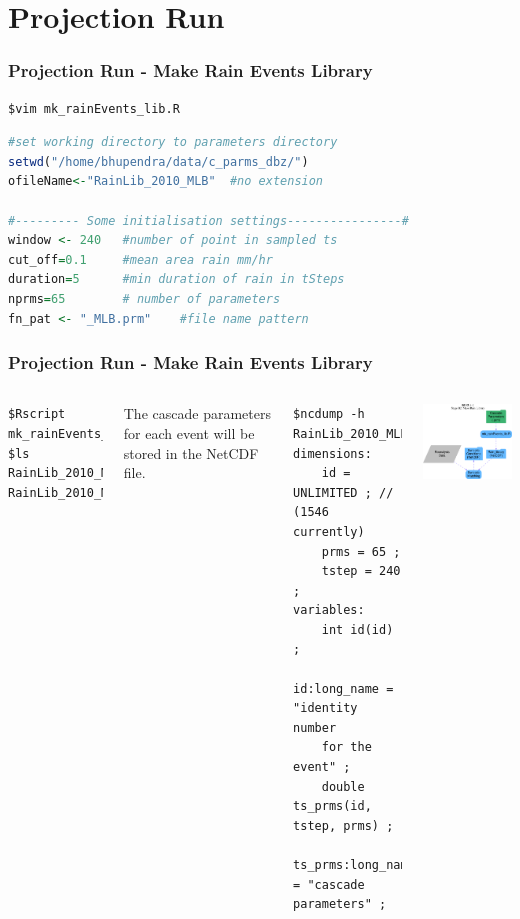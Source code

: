 \documentclass[aspectratio=169]{beamer}
\begin{document}
\section{Projection Run}
\begin{frame}[fragile]
\frametitle{Projection Run - Make Rain Events Library}
\begin{lstlisting}[style=BashInputStyle]
$vim mk_rainEvents_lib.R
\end{lstlisting}

\begin{lstlisting}[language=R]
#set working directory to parameters directory
setwd("/home/bhupendra/data/c_parms_dbz/")
ofileName<-"RainLib_2010_MLB"  #no extension

#--------- Some initialisation settings----------------#
window <- 240   #number of point in sampled ts
cut_off=0.1     #mean area rain mm/hr
duration=5      #min duration of rain in tSteps
nprms=65        # number of parameters 
fn_pat <- "_MLB.prm"    #file name pattern 
\end{lstlisting}

\end{frame}



\begin{frame}[fragile]
\frametitle{Projection Run - Make Rain Events Library}
\begin{columns}

\begin{lstlisting}[style=BashInputStyle] 
$Rscript mk_rainEvents_lib.R
$ls 
RainLib_2010_MLB.nc RainLib_2010_MLB.pdf
\end{lstlisting}
The cascade parameters for each event will be stored in the NetCDF file.
\begin{lstlisting}[style=BashInputStyle] 
$ncdump -h RainLib_2010_MLB.nc
dimensions:
    id = UNLIMITED ; // (1546 currently)
    prms = 65 ;
    tstep = 240 ;
variables:
    int id(id) ;
    id:long_name = "identity number 
    for the event" ;
	double ts_prms(id, tstep, prms) ;
    ts_prms:long_name = "cascade parameters" ;
\end{lstlisting}

\includegraphics[width=2.8in]{../fig/mkRainlib.pdf}

\end{columns}
\end{frame}
\end{document}
